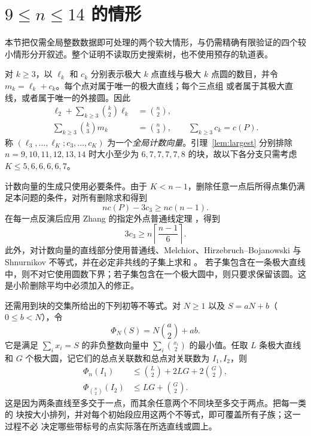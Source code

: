 \section{\texorpdfstring{$9\le n\le14$}{9<=n<=14} 的情形}
\label{sec:small-uniform}

本节把仅需全局整数数据即可处理的两个较大情形，与仍需精确有限验证的四个较小情形分开叙述。整个证明不读取历史搜索树，也不使用预存的轨道表。

对 $k\ge3$，以 $\ell_k$ 和 $c_k$ 分别表示极大 $k$ 点直线与极大
$k$ 点圆的数目，并令 $m_k=\ell_k+c_k$。每个点对属于唯一的极大直线；每个三点组
或者属于其极大直线，或者属于唯一的外接圆。因此
\begin{align}
 \ell_2+\sum_{k\ge3}\binom{k}{2}\ell_k&=\binom n2,
 \label{eq:small-line-pairs}\\
 \sum_{k\ge3}\binom{k}{3}m_k&=\binom n3,
 \qquad \sum_{k\ge3}c_k=c(P).
 \label{eq:small-triple-partition}
\end{align}
称 $(\ell_3,\ldots,\ell_K;c_3,\ldots,c_K)$ 为一个\emph{全局计数向量}。引理~\ref{lem:largest} 分别排除
$n=9,10,11,12,13,14$ 时大小至少为 $6,7,7,7,7,8$ 的块，故以下各分支只需考虑
$K\le5,6,6,6,6,7$。

计数向量的生成只使用必要条件。由于 $K<n-1$，删除任意一点后所得点集仍满足本问题的条件，对所有删除求和得到
\begin{equation}\label{eq:small-one-delete}
 n c(P)-3c_3\ge n c(n-1).
\end{equation}
在每一点反演后应用 Zhang 的指定外点普通线定理
\cite[Theorem~4.1]{zhang}，得到
\begin{equation}\label{eq:small-z-circle}
 3c_3\ge n\left\lceil\frac{n-1}{6}\right\rceil.
\end{equation}
此外，对计数向量的直线部分使用普通线、Melchior、Hirzebruch--Bojanowski 与 Shnurnikov 不等式，并在必定非共线的子集上求和
\cite[Eq.~(9)]{hirzebruch}\cite[Theorem~2.1]{pokora}\cite[Theorem~3]{shnurnikov}。
若子集包含在一条极大直线中，则不对它使用圆数下界；若子集包含在一个极大圆中，则只要求保留该圆。这是小阶删除平均中必须加入的修正。

还需用到块的交集所给出的下列初等不等式。对 $N\ge1$ 以及
$S=aN+b$（$0\le b<N$），令
\[
 \Phi_N(S)=N\binom a2+ab.
\]
它是满足 $\sum_i x_i=S$ 的非负整数向量中
$\sum_i\binom{x_i}{2}$ 的最小值。任取 $L$ 条极大直线和 $G$ 个极大圆，记它们的总点关联数和总点对关联数为 $I_1,I_2$，则
\begin{align}
 \Phi_n(I_1)&\le \binom L2+2LG+2\binom G2,
 \label{eq:small-block-point}\\
 \Phi_{\binom n2}(I_2)&\le LG+\binom G2.
 \label{eq:small-block-pair}
\end{align}
这是因为两条直线至多交于一点，而其余任意两个不同块至多交于两点。把每一类的
块按大小排列，并对每个初始段应用这两个不等式，即可覆盖所有子族；这一过程不必
决定哪些带标号的点实际落在所选直线或圆上。


